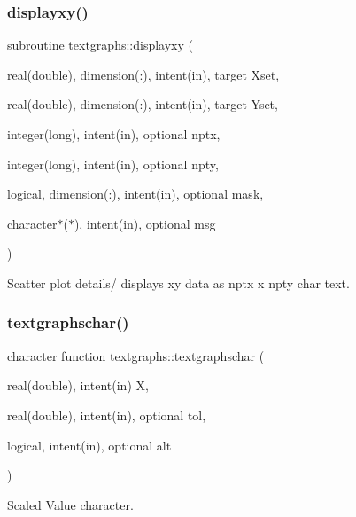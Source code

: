 \subsubsection{\texorpdfstring{displayxy()}{displayxy()}}
{\footnotesize\ttfamily subroutine textgraphs\+::displayxy (\begin{DoxyParamCaption}\item[{real(double), dimension(\+:), intent(in), target}]{Xset,  }\item[{real(double), dimension(\+:), intent(in), target}]{Yset,  }\item[{integer(long), intent(in), optional}]{nptx,  }\item[{integer(long), intent(in), optional}]{npty,  }\item[{logical, dimension(\+:), intent(in), optional}]{mask,  }\item[{character$\ast$($\ast$), intent(in), optional}]{msg }\end{DoxyParamCaption})\hspace{0.3cm}{\ttfamily [private]}}



Scatter plot details/ displays xy data as nptx x npty char text. 

\mbox{\label{namespacetextgraphs_accad584018d6cbbc199cc77b34ef2db5}} 
\subsubsection{\texorpdfstring{textgraphschar()}{textgraphschar()}}
{\footnotesize\ttfamily character function textgraphs\+::textgraphschar (\begin{DoxyParamCaption}\item[{real(double), intent(in)}]{X,  }\item[{real(double), intent(in), optional}]{tol,  }\item[{logical, intent(in), optional}]{alt }\end{DoxyParamCaption})\hspace{0.3cm}{\ttfamily [private]}}



Scaled Value character. 

